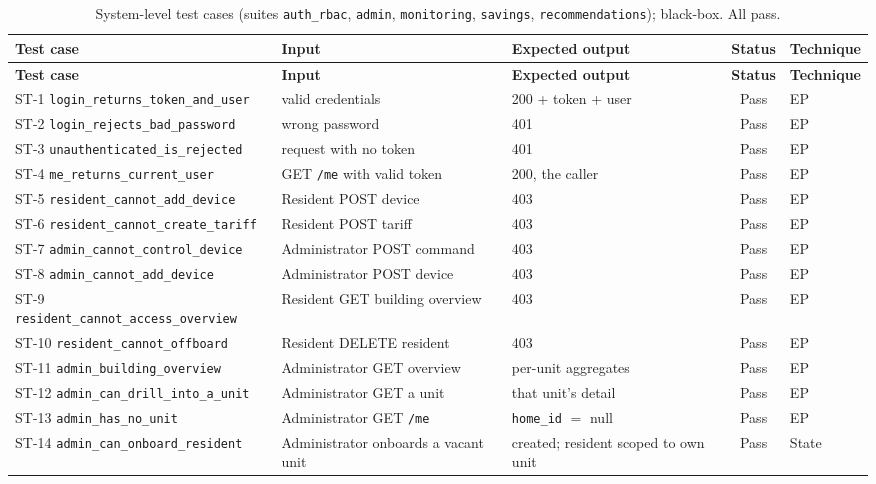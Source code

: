 {\footnotesize
\begin{xltabular}{\textwidth}{@{}L{0.225\textwidth} X X c L{0.06\textwidth}@{}}
\caption{System-level test cases (suites \texttt{auth\_rbac}, \texttt{admin},
\texttt{monitoring}, \texttt{savings}, \texttt{recommendations}); black-box. All pass.}
\label{tab:sys-cases}\\
\toprule
\textbf{Test case} & \textbf{Input} & \textbf{Expected output} & \textbf{Status} & \textbf{Technique} \\
\midrule
\endfirsthead
\toprule
\textbf{Test case} & \textbf{Input} & \textbf{Expected output} & \textbf{Status} & \textbf{Technique} \\
\midrule
\endhead
ST-1 \texttt{login\_returns\_token\_and\_user} & valid credentials & 200 + token + user & Pass & EP \\
ST-2 \texttt{login\_rejects\_bad\_password} & wrong password & 401 & Pass & EP \\
ST-3 \texttt{unauthenticated\_is\_rejected} & request with no token & 401 & Pass & EP \\
ST-4 \texttt{me\_returns\_current\_user} & GET \texttt{/me} with valid token & 200, the caller & Pass & EP \\
ST-5 \texttt{resident\_cannot\_add\_device} & Resident POST device & 403 & Pass & EP \\
ST-6 \texttt{resident\_cannot\_create\_tariff} & Resident POST tariff & 403 & Pass & EP \\
ST-7 \texttt{admin\_cannot\_control\_device} & Administrator POST command & 403 & Pass & EP \\
ST-8 \texttt{admin\_cannot\_add\_device} & Administrator POST device & 403 & Pass & EP \\
ST-9 \texttt{resident\_cannot\_access\_overview} & Resident GET building overview & 403 & Pass & EP \\
ST-10 \texttt{resident\_cannot\_offboard} & Resident DELETE resident & 403 & Pass & EP \\
ST-11 \texttt{admin\_building\_overview} & Administrator GET overview & per-unit aggregates & Pass & EP \\
ST-12 \texttt{admin\_can\_drill\_into\_a\_unit} & Administrator GET a unit & that unit's detail & Pass & EP \\
ST-13 \texttt{admin\_has\_no\_unit} & Administrator GET \texttt{/me} & \texttt{home\_id} $=$ null & Pass & EP \\
ST-14 \texttt{admin\_can\_onboard\_resident} & Administrator onboards a vacant unit & created; resident scoped to own unit & Pass & State \\

\end{xltabular}}
